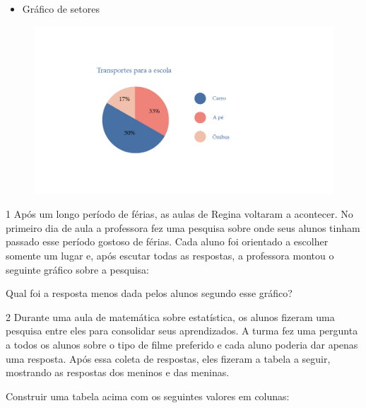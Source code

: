 {\begin{itemize}
\item
  Gráfico de setores
\end{itemize}

\begin{figure}[htpb!]
\includegraphics[width=\textwidth]{../ilustracoes/MAT5/SAEB_5ANO_MAT_figura60.png}
\end{figure}
}


\num{1} Após um longo período de férias, as aulas de Regina voltaram a
acontecer. No primeiro dia de aula a professora fez uma pesquisa sobre
onde seus alunos tinham passado esse período gostoso de férias. Cada
aluno foi orientado a escolher somente um lugar e, após escutar todas as
respostas, a professora montou o seguinte gráfico sobre a pesquisa:


Qual foi a resposta menos dada pelos alunos segundo esse gráfico?



\num{2} Durante uma aula de matemática sobre estatística, os alunos fizeram
uma pesquisa entre eles para consolidar seus aprendizados. A turma fez
uma pergunta a todos os alunos sobre o tipo de filme preferido e cada
aluno poderia dar apenas uma resposta. Após essa coleta de respostas,
eles fizeram a tabela a seguir, mostrando as respostas dos meninos e das meninas.


Construir uma tabela acima com os seguintes valores em colunas:

